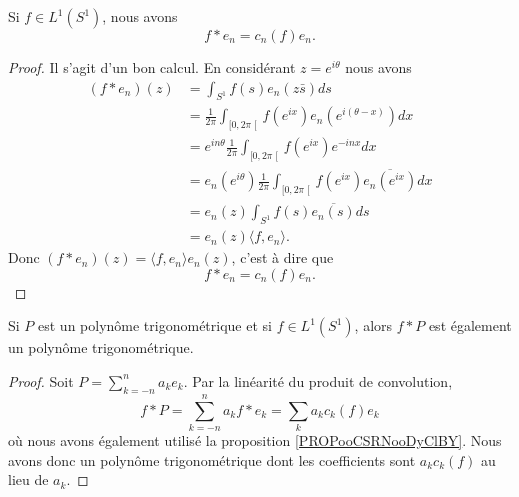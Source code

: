 \begin{proposition}     \label{PROPooCSRNooDyClBY}
    Si \( f\in L^1(S^1)\), nous avons
    \begin{equation}
        f*e_n=c_n(f)e_n.
    \end{equation}
\end{proposition}

\begin{proof}
    Il s'agit d'un bon calcul. En considérant \( z= e^{i\theta}\) nous avons
    \begin{subequations}
        \begin{align}
            (f*e_n)(z)&=\int_{S^1}f(s)e_n(z\bar s)ds\\
            &=\frac{1}{ 2\pi }\int_{\mathopen[ 0 , 2\pi \mathclose[}f( e^{ix})e_n(  e^{i(\theta-x)}) dx\\
            &= e^{in\theta}\frac{1}{ 2\pi }\int_{\mathopen[ 0 , 2\pi \mathclose[}f( e^{ix}) e^{-inx}dx\\
            &=e_n( e^{i\theta})\frac{1}{ 2\pi }\int_{\mathopen[ 0 , 2\pi \mathclose[}f( e^{ix})\overline{ e_n( e^{ix}) }dx\\
                &=e_n(z)\int_{S^1}f(s)\overline{ e_n(s) }ds\\
                &=e_n(z)\langle f, e_n\rangle.
        \end{align}
    \end{subequations}
    Donc \( (f*e_n)(z)=\langle f, e_n\rangle e_n(z)\), c'est à dire que
    \begin{equation}
        f*e_n=c_n(f)e_n.
    \end{equation}
\end{proof}

\begin{lemma}
    Si \( P\) est un polynôme trigonométrique et si \( f\in L^1(S^1)\), alors \( f*P\) est également un polynôme trigonométrique.
\end{lemma}

\begin{proof}
    Soit \( P=\sum_{k=-n}^na_ke_k\). Par la linéarité du produit de convolution,
    \begin{equation}
        f*P=\sum_{k=-n}^na_kf*e_k=\sum_ka_kc_k(f)e_k
    \end{equation}
    où nous avons également utilisé la proposition \ref{PROPooCSRNooDyClBY}. Nous avons donc un polynôme trigonométrique dont les coefficients sont \( a_kc_k(f)\) au lieu de \( a_k\).
\end{proof}


